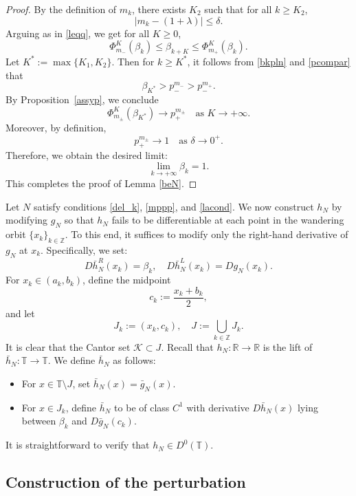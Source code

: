 \documentclass{amsart}
\theoremstyle{definition}
\begin{document}
\begin{proof}
By the definition of $m_k$, there exists $K_2$ such that for all $k \geq K_2$,
\[
|m_k - (1 + \lambda)| \leq \delta.
\]
Arguing as in \eqref{leqq}, we get for all $K \geq 0$,
\[
\Phi_{m_-}^K(\beta_k) \leq \beta_{k+K} \leq \Phi_{m_+}^K(\beta_k).
\]
Let $K^* := \max\{K_1, K_2\}$. Then for $k \geq K^*$, it follows from \eqref{bkpln} and \eqref{pcompar} that
\[
\beta_{K^*} > p_-^{m_-} > p_-^{m_+}.
\]
By Proposition~\ref{assyp}, we conclude
\[
\Phi_{m_\pm}^K(\beta_{K^*}) \to p_+^{m_\pm} \quad \text{as } K \to +\infty.
\]
Moreover, by definition,
\[
p_+^{m_\pm} \to 1 \quad \text{as } \delta \to 0^+.
\]
Therefore, we obtain the desired limit:
\[
\lim_{k \to +\infty} \beta_k = 1.
\]
This completes the proof of Lemma \ref{beN}.\end{proof}

\medskip

Let $N$ satisfy conditions \eqref{del_k}, \eqref{mppp}, and \eqref{lacond}. We now construct $h_N$ by modifying $g_N$ so that $h_N$ fails to be differentiable at each point in the wandering orbit $\{x_k\}_{k \in \mathbb{Z}}$. To this end, it suffices to modify only the right-hand derivative of $g_N$ at $x_k$. Specifically, we set:
\[
D\bar{h}_N^R(x_k) = \beta_k, \quad D\bar{h}_N^L(x_k) = Dg_N(x_k).
\]
For $x_k \in (a_k, b_k)$, define the midpoint
\[
c_k := \frac{x_k + b_k}{2},
\]
and let
\[
J_k := (x_k, c_k), \quad J := \bigcup_{k \in \mathbb{Z}} J_k.
\]
It is clear that the Cantor set $\mathcal{K} \subset J$. Recall that $h_N : \mathbb{R} \to \mathbb{R}$ is the lift of $\bar{h}_N : \mathbb{T} \to \mathbb{T}$. We define $\bar{h}_N$ as follows:
\begin{itemize}
\item For $x \in \mathbb{T} \setminus J$, set $\bar{h}_N(x) = \bar{g}_N(x)$.
\item For $x \in J_k$, define $\bar{h}_N$ to be of class $C^1$ with derivative $D\bar{h}_N(x)$ lying between $\beta_k$ and $D\bar{g}_N(c_k)$.
\end{itemize}
It is straightforward to verify that $h_N \in D^0(\mathbb{T})$.






\subsection{Construction of the perturbation}
\end{document}
